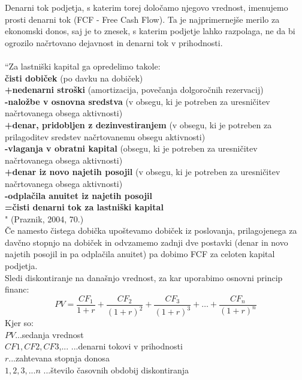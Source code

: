 \documentclass[12pt,a4paper]{amsart}
\theoremstyle{definition} %
\theoremstyle{plain} %
\begin{document}
Denarni tok podjetja, s katerim torej določamo njegovo vrednost, imenujemo prosti denarni tok (FCF - Free Cash Flow). Ta je najprimernejše merilo za ekonomski donos, saj je to znesek, s katerim podjetje lahko razpolaga, ne da bi ogrozilo načrtovano dejavnost  in denarni tok v prihodnosti.\\
\\
``Za lastniški kapital ga opredelimo takole:\\
\textbf{čisti dobiček} (po davku na dobiček)\\
\textbf{+nedenarni stroški} (amortizacija, povečanja dolgoročnih rezervacij)\\
\textbf{-naložbe v osnovna sredstva }(v obsegu, ki je potreben za uresničitev načrtovanega obsega aktivnosti)\\
\textbf{+denar, pridobljen z dezinvestiranjem} (v obsegu, ki je potreben za prilagoditev sredstev načrtovanemu obsegu aktivnosti)\\
\textbf{-vlaganja v obratni kapital }(obsegu, ki je potreben za uresničitev načrtovanega obsega aktivnosti)\\
\textbf{+denar iz novo najetih posojil} (v obsegu, ki je potreben za uresničitev načrtovanega obsega aktivnosti)\\
\textbf{-odplačila anuitet iz najetih posojil}\\
\textbf{=čisti denarni tok  za lastniški kapital}\\ " (Praznik, 2004, 70.)\\

Če namesto čistega dobička upoštevamo dobiček iz poslovanja, prilagojenega za davčno stopnjo na dobiček in odvzamemo zadnji dve postavki (denar in novo najetih posojil in pa odplačila anuitet) pa dobimo FCF za celoten kapital podjetja.\\

Sledi diskontiranje na današnjo vrednost, za kar uporabimo osnovni princip financ:
\begin{equation}
PV=\frac{CF_1}{1+r}+\frac{CF_2}{(1+r)^2}+\frac{CF_3}{(1+r)^3}+\ldots+\frac{CF_n}{(1+r)^n}
\end{equation}
Kjer so:\\
$PV$...sedanja vrednost\\
$CF1, CF2, CF3$,... ...denarni tokovi v prihodnosti\\
$r$...zahtevana stopnja donosa\\
$1,2,3,...n$ ...število časovnih obdobij diskontiranja\\
\end{document}
